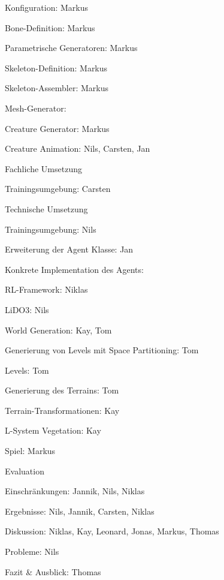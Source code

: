 \begin{thallok}
\begin{thallok}
\begin{thallok}
\begin{thallok}
				\item Konfiguration: Markus
				\item Bone-Definition: Markus
				\item Parametrische Generatoren: Markus
				\item Skeleton-Definition: Markus
				\item Skeleton-Assembler: Markus
				\item Mesh-Generator:
				\item Creature Generator: Markus
			\end{thallok}
		\end{thallok}
		\item Creature Animation: Nils, Carsten, Jan
		\begin{thallok}
			\item Fachliche Umsetzung
			\begin{thallok}
				\item Trainingsumgebung: Carsten
			\end{thallok}
			\item Technische Umsetzung
			\begin{thallok}
				\item Trainingsumgebung: Nils
				\item Erweiterung der Agent Klasse: Jan
				\item Konkrete Implementation des Agents:
				\item RL-Framework: Niklas
				\item LiDO3: Nils
			\end{thallok}
		\end{thallok}
		\item World Generation: Kay, Tom
		\begin{thallok}
			\item Generierung von Levels mit Space Partitioning: Tom
			\item Levels: Tom
			\item Generierung des Terrains: Tom
			\item Terrain-Transformationen: Kay
			\item L-System Vegetation: Kay
		\end{thallok}
		\item Spiel: Markus
	\end{thallok}
	\item Evaluation
	\begin{thallok}
		\item Einschränkungen: Jannik, Nils, Niklas
		\item Ergebnisse: Nils, Jannik, Carsten, Niklas
		\item Diskussion: Niklas, Kay, Leonard, Jonas, Markus, Thomas
		\item Probleme: Nils
	\end{thallok}
	\item Fazit \& Ausblick: Thomas
\end{thallok}

